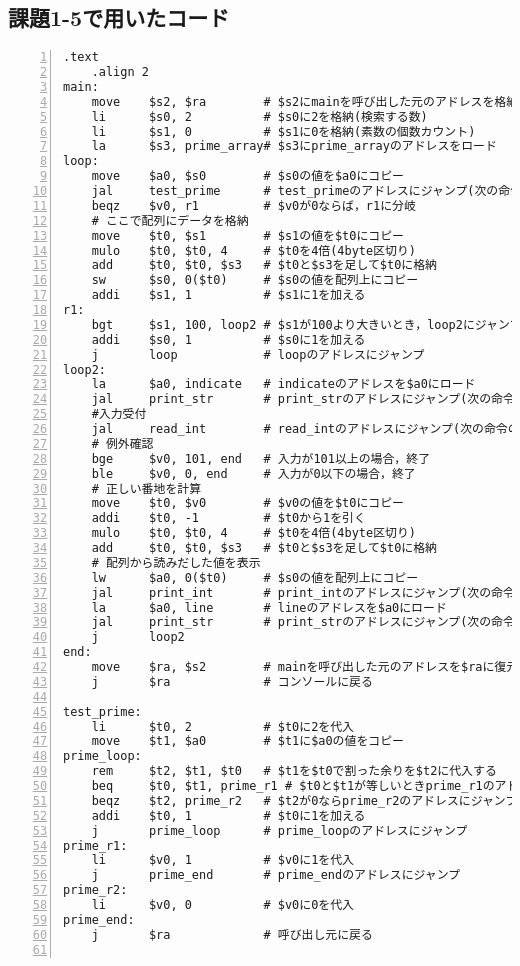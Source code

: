 \subsection{課題1-5で用いたコード} \label{sec:p1-5}
\begin{Verbatim}[numbers=left, xleftmargin=10mm, numbersep=6pt,
                    fontsize=\small, baselinestretch=0.8]
    .text
    .align 2
main:
    move    $s2, $ra        # $s2にmainを呼び出した元のアドレスを格納
    li      $s0, 2          # $s0に2を格納(検索する数)
    li      $s1, 0          # $s1に0を格納(素数の個数カウント)
    la      $s3, prime_array# $s3にprime_arrayのアドレスをロード
loop:
    move    $a0, $s0        # $s0の値を$a0にコピー
    jal     test_prime      # test_primeのアドレスにジャンプ(次の命令のアドレスを$raに)
    beqz    $v0, r1         # $v0が0ならば，r1に分岐
    # ここで配列にデータを格納
    move    $t0, $s1        # $s1の値を$t0にコピー
    mulo    $t0, $t0, 4     # $t0を4倍(4byte区切り)
    add     $t0, $t0, $s3   # $t0と$s3を足して$t0に格納
    sw      $s0, 0($t0)     # $s0の値を配列上にコピー
    addi    $s1, 1          # $s1に1を加える
r1:
    bgt     $s1, 100, loop2 # $s1が100より大きいとき，loop2にジャンプ
    addi    $s0, 1          # $s0に1を加える
    j       loop            # loopのアドレスにジャンプ
loop2:
    la      $a0, indicate   # indicateのアドレスを$a0にロード
    jal     print_str       # print_strのアドレスにジャンプ(次の命令のアドレスを$raに)
    #入力受付
    jal     read_int        # read_intのアドレスにジャンプ(次の命令のアドレスを$raに)
    # 例外確認
    bge     $v0, 101, end   # 入力が101以上の場合，終了
    ble     $v0, 0, end     # 入力が0以下の場合，終了
    # 正しい番地を計算
    move    $t0, $v0        # $v0の値を$t0にコピー
    addi    $t0, -1         # $t0から1を引く
    mulo    $t0, $t0, 4     # $t0を4倍(4byte区切り)
    add     $t0, $t0, $s3   # $t0と$s3を足して$t0に格納
    # 配列から読みだした値を表示
    lw      $a0, 0($t0)     # $s0の値を配列上にコピー
    jal     print_int       # print_intのアドレスにジャンプ(次の命令のアドレスを$raに)
    la      $a0, line       # lineのアドレスを$a0にロード
    jal     print_str       # print_strのアドレスにジャンプ(次の命令のアドレスを$raに)
    j       loop2
end:
    move    $ra, $s2        # mainを呼び出した元のアドレスを$raに復元
    j       $ra             # コンソールに戻る

test_prime:
    li      $t0, 2          # $t0に2を代入
    move    $t1, $a0        # $t1に$a0の値をコピー
prime_loop:
    rem     $t2, $t1, $t0   # $t1を$t0で割った余りを$t2に代入する
    beq     $t0, $t1, prime_r1 # $t0と$t1が等しいときprime_r1のアドレスにジャンプ
    beqz    $t2, prime_r2   # $t2が0ならprime_r2のアドレスにジャンプ
    addi    $t0, 1          # $t0に1を加える
    j       prime_loop      # prime_loopのアドレスにジャンプ
prime_r1:
    li      $v0, 1          # $v0に1を代入
    j       prime_end       # prime_endのアドレスにジャンプ
prime_r2:
    li      $v0, 0          # $v0に0を代入
prime_end:
    j       $ra             # 呼び出し元に戻る


\end{Verbatim}

